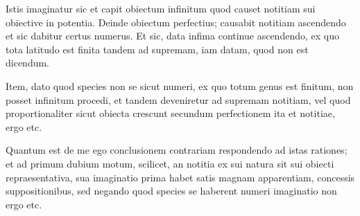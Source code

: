 \documentclass[twoside, openright]{report}
\begin{document}
        \pstart
        Istis  imaginatur sic et capit obiectum infinitum quod causet notitiam sui obiective in potentia. Deinde  obiectum perfectius; causabit notitiam   ascendendo et sic dabitur certus numerus. Et sic, data infima  continue ascendendo, ex quo tota latitudo est  finita tandem  ad supremam,  iam datam, quod non est dicendum.
        \pend
     
        \pstart
        Item, dato quod species non se  sicut numeri, ex quo totum genus  est finitum, non posset  infinitum procedi, et  tandem deveniretur ad supremam notitiam, vel  quod proportionaliter sicut obiecta crescunt secundum perfectionem ita et notitiae, ergo etc.
        \pend
     
        \pstart
        Quantum  est de me ego  conclusionem contrariam respondendo ad istas rationes; et ad primum dubium motum, scilicet, an notitia ex sui natura sit sui obiecti repraesentativa,  sua imaginatio prima habet satis magnam apparentiam, concessis suppositionibus, sed negando quod species  se haberent  numeri  imaginatio non  ergo etc.
        \pend
        
        \endnumbering
        
     
        
\end{document}
